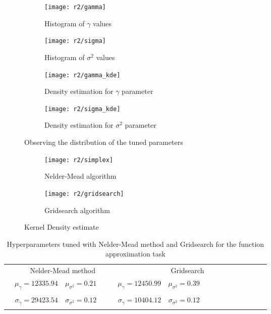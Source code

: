 \documentclass[conference,compsoc]{IEEEtran}
\begin{document}
\begin{figure}
\centering
  \begin{subfigure}{8cm}
    \centering\texttt{[image: r2/gamma]}

    \caption{Histogram of $\gamma$ values }
  \end{subfigure}
  \begin{subfigure}{8cm}
    \centering\texttt{[image: r2/sigma]}
    \caption{Histogram of $\sigma^2$ values }
  \end{subfigure}
 \vspace{1cm}
  \begin{subfigure}{8cm}
    \centering\texttt{[image: r2/gamma\_kde]}
 \caption{Density estimation for $\gamma$ parameter}
  \end{subfigure}
    \begin{subfigure}{8cm}
    \centering\texttt{[image: r2/sigma\_kde]}
    \caption{Density estimation for $\sigma^2$ parameter}
  \end{subfigure}
\caption{Observing the distribution of the tuned parameters}
    \label{fig:tune3}
\end{figure}


\begin{figure}
\centering
  \begin{subfigure}{8cm}
    \centering\texttt{[image: r2/simplex]}
   \caption{Nelder-Mead algorithm}
  \end{subfigure}
   \begin{subfigure}{8cm}
    \centering\texttt{[image: r2/gridsearch]}
   \caption{Gridsearch algorithm}
  \end{subfigure}

  \caption{Kernel Density estimate}
    \label{fig:tune4}
\end{figure}

\begin{table*}\centering
\begin{tabular}{@{}rrrrrrrccrrrcrrr@{}}\toprule
& \multicolumn{4}{c}{Nelder-Mead method} & \phantom{abc}& \multicolumn{2}{c}{Gridsearch} &
\phantom{abc} \\
\cmidrule{2-5} \cmidrule{7-9} \cmidrule{10-12}


 &   $\mu_\gamma=12335.94$ & $\mu_{\sigma^2}= 0.21$ &  &&  $\mu_\gamma= 12450.99$ & $\mu_{\sigma^2}= 0.39$ \\\\
 
  &    $\sigma_\gamma=29423.54 $& $\sigma_{\sigma^2}= 0.12$ &&& $\sigma_\gamma=10404.12 $& $\sigma_{\sigma^2}= 0.12$ \\\\
  

\bottomrule
\end{tabular}
\caption{Hyperparameters tuned with Nelder-Mead method and Gridsearch for the function approximation task}
       \label{table:tune2}
\end{table*}
\end{document}
